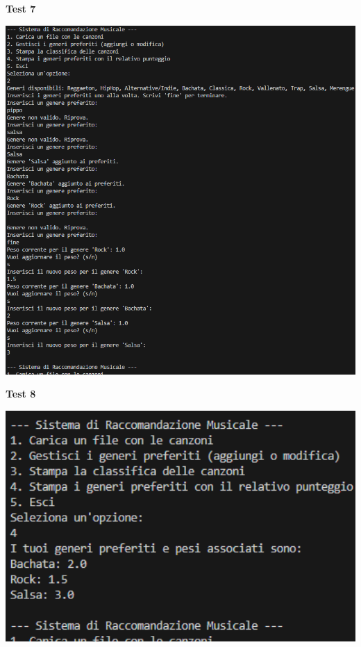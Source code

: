 \documentclass[a4paper,11pt]{article}
\begin{document}
\newpage
\begin{center}
    \textbf{Test 7}
    \par
    \vspace{0.5cm}
    \includegraphics[width=1\textwidth]{htest7}
\end{center}
\begin{center}
    \textbf{Test 8}
    \par
    \vspace{0.5cm}
    \includegraphics[width=1\textwidth]{htest8}
\end{center}
\end{document}
